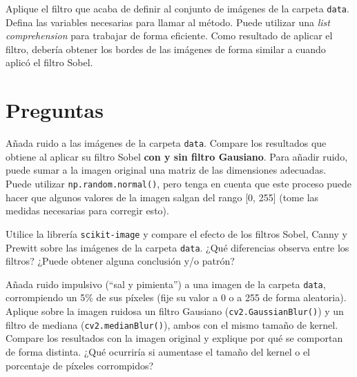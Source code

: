Aplique el filtro que acaba de definir al conjunto de imágenes de la carpeta \texttt{data}. Defina las variables necesarias para llamar al método. Puede utilizar una \textit{list comprehension} para trabajar de forma eficiente. Como resultado de aplicar el filtro, debería obtener los bordes de las imágenes de forma similar a cuando aplicó el filtro Sobel.

\section*{Preguntas}

\vspace{5mm}
\begin{tcolorbox}[colback=gray!10, colframe=gray!30, coltitle=black, title=Pregunta A.1, halign=left]
Añada ruido a las imágenes de la carpeta \texttt{data}. Compare los resultados que obtiene al aplicar su filtro Sobel \textbf{con y sin filtro Gausiano}. Para añadir ruido, puede sumar a la imagen original una matriz de las dimensiones adecuadas. Puede utilizar \texttt{np.random.normal()}, pero tenga en cuenta que este proceso puede hacer que algunos valores de la imagen salgan del rango [0, 255] (tome las medidas necesarias para corregir esto).
\end{tcolorbox}

\vspace{5mm}
\begin{tcolorbox}[colback=gray!10, colframe=gray!30, coltitle=black, title=Pregunta A.2, halign=left]
Utilice la librería \texttt{scikit-image} y compare el efecto de los filtros Sobel, Canny y Prewitt sobre las imágenes de la carpeta \texttt{data}. ¿Qué diferencias observa entre los filtros? ¿Puede obtener alguna conclusión y/o patrón?
\end{tcolorbox}

\vspace{5mm}
\begin{tcolorbox}[colback=gray!10, colframe=gray!30, coltitle=black, title=Pregunta A.3, halign=left]
Añada ruido impulsivo (``sal y pimienta'') a una imagen de la carpeta \texttt{data}, corrompiendo un 5\% de sus píxeles (fije su valor a 0 o a 255 de forma aleatoria). Aplique sobre la imagen ruidosa un filtro Gausiano (\texttt{cv2.GaussianBlur()}) y un filtro de mediana (\texttt{cv2.medianBlur()}), ambos con el mismo tamaño de kernel. Compare los resultados con la imagen original y explique por qué se comportan de forma distinta. ¿Qué ocurriría si aumentase el tamaño del kernel o el porcentaje de píxeles corrompidos?
\end{tcolorbox}